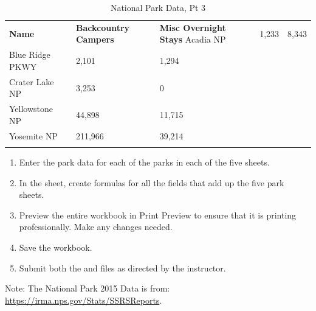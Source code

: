 \begin{table}[H]
	{\small
		\begin{longtable}{L{1.25in}L{0.60in}L{0.60in}} %
			\textbf{Name} & \textbf{Backcountry Campers} & \textbf{Misc Overnight Stays} \endhead
			\hline
			Acadia NP       & 1,233   & 8,343  \\
			Blue Ridge PKWY & 2,101   & 1,294  \\
			Crater Lake NP  & 3,253   & 0      \\
			Yellowstone NP  & 44,898  & 11,715 \\
			Yosemite NP     & 211,966 & 39,214 \\
			\caption{National Park Data, Pt 3}
			\label{06:tab07}
		\end{longtable}
	}
\end{table}

\begin{enumerate}[resume]
	\item Enter the park data for each of the parks in each of the five sheets.
	\item In the  sheet, create formulas for all the fields that add up the five park sheets.
	\item Preview the entire workbook in Print Preview to ensure that it is printing professionally. Make any changes needed.
	\item Save the  workbook.
	\item Submit both the  and  files as directed by the instructor.
\end{enumerate}

Note: The National Park 2015 Data is from: \url{https://irma.nps.gov/Stats/SSRSReports}.


